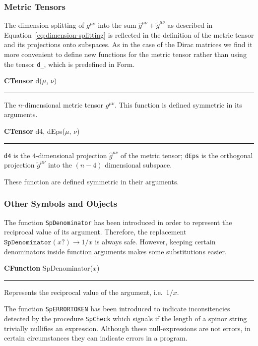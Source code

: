 \documentclass[preprint,number,12pt,sort&compress]{elsarticle}
\newlength{\funcindent}
\newlength{\funcwidth}
\newenvironment{CFunction}[2]{%
\hspace{.8\funcindent}\begin{boxedminipage}{\funcwidth}
	\raggedright \textbf{CFunction} #1(#2)

	\vspace{-1.5ex}

	\rule{\textwidth}{0.5\fboxrule}
	\setlength{\parskip}{2ex}
}{\end{boxedminipage}}
\newenvironment{CTensor}[2]{%
\hspace{.8\funcindent}\begin{boxedminipage}{\funcwidth}
	\raggedright \textbf{CTensor} #1(#2)

	\vspace{-1.5ex}

	\rule{\textwidth}{0.5\fboxrule}
	\setlength{\parskip}{2ex}
}{\end{boxedminipage}}
\begin{document}
\subsubsection{Metric Tensors}
The dimension splitting of $g^{\mu\nu}$ into the sum
$\hat{g}^{\mu\nu}+\tilde{g}^{\mu\nu}$ as described in
Equation~\eqref{eq:dimension-splitting} is reflected in the
definition of the metric tensor and its projections onto subspaces.
As in the case of the Dirac matrices we find it more convenient to
define new functions for the metric tensor rather than using the
tensor \texttt{d\_}, which is predefined in Form.

\medskip
\begin{CTensor}{d}{$\mu$, $\nu$}
   The $n$-dimensional metric tensor $g^{\mu\nu}$.
	This function is defined symmetric in its arguments.
\end{CTensor}

\medskip
\begin{CTensor}{d4, dEps}{$\mu$, $\nu$}
   \texttt{d4} is the $4$-dimensional projection $\hat{g}^{\mu\nu}$
	of the metric tensor;
	\texttt{dEps} is the orthogonal projection $\tilde{g}^{\mu\nu}$ into the
	$(n-4)$ dimensional subspace.

	These function are defined symmetric in their arguments.
\end{CTensor}

\subsubsection{Other Symbols and Objects}
The function \texttt{SpDenominator} has been introduced in order to represent
the reciprocal value of its argument. Therefore, the replacement
$\mathtt{SpDenominator}(x\mathtt{?})\rightarrow 1/x$ is always safe.
However, keeping certain denominators inside function arguments makes
some substitutions easier.

\medskip
\begin{CFunction}{SpDenominator}{$x$}
   Represents the reciprocal value of the argument, i.e.~$1/x$.
\end{CFunction}
\medskip

The function \texttt{SpERRORTOKEN} has been introduced to indicate
inconsitencies detected by the procedure \texttt{SpCheck} which
signals if the length of a spinor string trivially nullifies an
expression. Although these null-expressions are not errors, in certain
circumstances they can indicate errors in a program.
\end{document}
